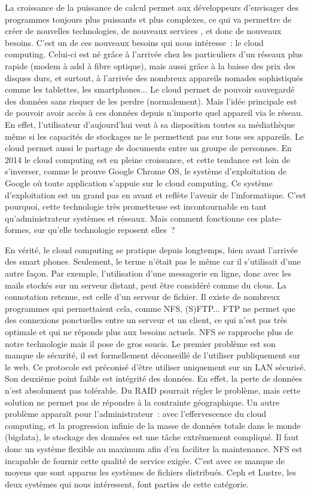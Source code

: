 \documentclass[12pt]{article}
\begin{document}
La croissance de la puissance de calcul permet aux développeurs d'envisager des programmes toujours plus puissants et plus complexes, ce qui va permettre de créer de nouvelles technologies, de nouveaux services , et donc de nouveaux besoins. C'est un de ces nouveaux besoins qui nous intéresse : le cloud computing. Celui-ci est né grâce à l'arrivée chez les particuliers d'un réseaux plus rapide (modem à adsl à fibre optique), mais aussi grâce à la baisse des prix des disques durs, et surtout, à l'arrivée des nombreux appareils nomades sophistiqués comme les tablettes, les smartphones... Le cloud permet de pouvoir sauvegardé des données sans risquer de les perdre (normalement). Mais l'idée principale est de pouvoir avoir accès à ces données depuis n'importe quel appareil via le réseau. En effet, l'utilisateur d'aujourd'hui veut à sa disposition toutes sa médiathèque même si les capacités de stockages ne le permettent pas sur tous ses appareils. Le cloud permet aussi le partage de documents entre un groupe de personnes. En 2014 le cloud computing est en pleine croissance, et cette tendance est loin de s'inverser, comme le prouve Google Chrome OS, le système d'exploitation de Google où toute application s'appuie sur le cloud computing. Ce système d'exploitation est un grand pas en avant et reflète l'avenir de l'informatique. C'est pourquoi, cette technologie très prometteuse est incontournable en tant qu'administrateur systèmes et réseaux. Mais comment fonctionne ces plate-formes, sur qu'elle technologie reposent elles ? 


En vérité, le cloud computing se pratique depuis longtemps, bien avant l'arrivée des smart phones. Seulement, le terme n'était pas le même car il s'utilisait d'une autre façon. Par exemple, l'utilisation d'une messagerie en ligne, donc avec les mails stockés sur un serveur distant, peut être considéré comme du clous. La connotation retenue, est celle d'un serveur de fichier. Il existe de nombreux programmes qui permettaient cela, comme NFS, (S)FTP... FTP ne permet que des connexions ponctuelles entre un serveur et un client, ce qui n'est pas très optimale et qui ne réponds plus aux besoins actuels. NFS se rapproche plus de notre technologie mais il pose de gros soucis. Le premier problème est son manque de sécurité, il est formellement déconseillé de l’utiliser publiquement sur le web. Ce protocole est préconisé d'être utiliser uniquement sur un LAN sécurisé. Son deuxième point faible est intégrité des données. En effet, la perte de données n'est absolument pas tolérable. Du RAID pourrait régler le problème, mais cette solution ne permet pas de répondre à la contrainte géographique. Un autre problème apparaît pour l'administrateur : avec l'effervescence du cloud computing, et la progression infinie de la masse de données totale dans le monde (bigdata), le stockage des données est une tâche extrêmement compliqué. Il faut donc un système flexible au maximum afin d'en faciliter la maintenance. NFS est incapable de fournir cette qualité de service exigée. C'est avec ce manque de moyens que sont apparus les systèmes de fichiers distribués. Ceph et Lustre, les deux systèmes qui nous intéressent, font parties de cette catégorie.
\end{document}
